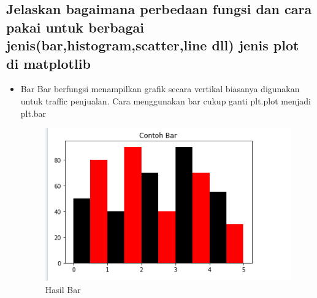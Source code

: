 \subsection{Jelaskan bagaimana perbedaan fungsi dan cara pakai untuk berbagai jenis(bar,histogram,scatter,line dll) jenis plot di matplotlib}
\begin{itemize}
    \item Bar\newline
    Bar berfungsi menampilkan grafik secara vertikal biasanya digunakan untuk traffic penjualan.\newline
    Cara menggunakan bar cukup ganti plt.plot menjadi plt.bar

    

\begin{figure}[h]
\centering
\includegraphics[scale=0.3]{figures/6/Teori/1174038/2.png}
\caption{Hasil Bar}
\label{fig:contoh}
\end{figure}
\end{itemize}

